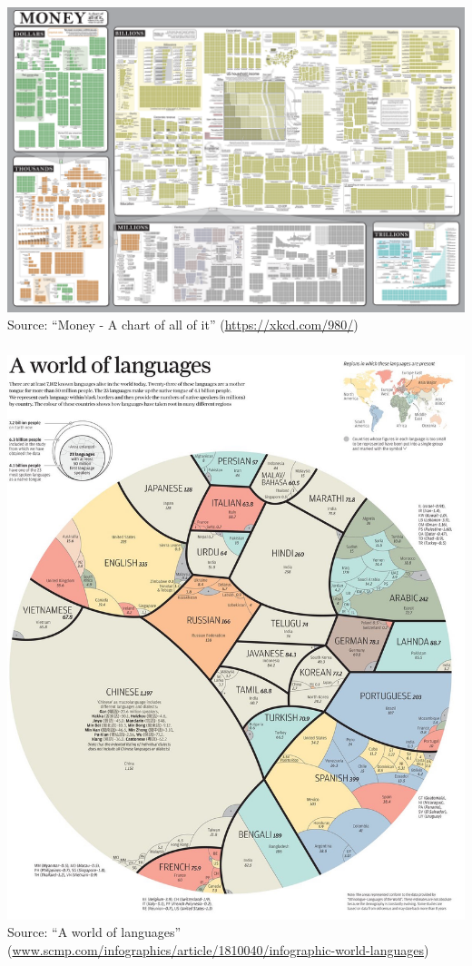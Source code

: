 \documentclass[8pt]{beamer}
\begin{document}

\begin{frame}
\frametitle{\insertsection}
\centering
\includegraphics[width=0.9\linewidth]{money}\\
\tiny{Source: ``Money - A chart of all of it'' (\url{https://xkcd.com/980/})}
\end{frame}


\begin{frame}
\frametitle{\insertsection}
\centering
\includegraphics[width=0.5\linewidth]{languages}\\
\tiny{Source: ``A world of languages'' (\url{www.scmp.com/infographics/article/1810040/infographic-world-languages})}
\end{frame}

\end{document}
